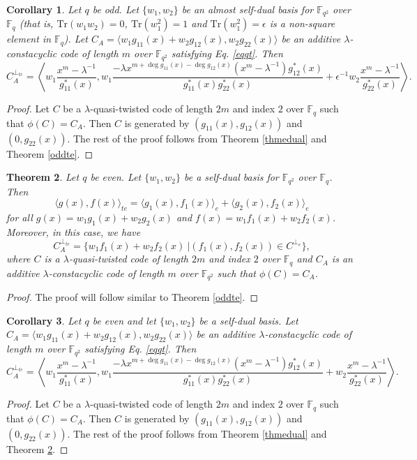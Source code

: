\documentclass[12 pt]{extarticle}
\numberwithin{equation}{section}
\newtheorem{theorem}{Theorem}[section]
\newtheorem{corollary}[theorem]{Corollary}
\theoremstyle{definition}
\begin{document}
\begin{corollary}\label{teodddual}
    Let  $q$ be odd. Let $\{w_1,w_2\}$ be an almost self-dual basis for $\mathbb{F}_{q^2}$ over $\mathbb{F}_q$ 
 (that is,  $\text{Tr}(w_1w_2)=0$, $\text{Tr}(w_1^2)=1$ and  $\text{Tr}(w_1^2)=\epsilon$ is a non-square element in $\mathbb{F}_q$). 
 Let $C_A=\langle w_1g_{11}(x)+w_2g_{12}(x),w_2g_{22}(x)\rangle$ be an additive $\lambda$-constacyclic code of length $m$ over $\mathbb{F}_{q^2}$  satisfying Eq. \ref{eqqt}. Then
    $$C_A^{\perp_{te}}=\left \langle w_1\frac{x^m-\lambda^{-1}}{g^*_{11}(x)}, w_1\frac{-\lambda x^{m+\deg g_{11}(x)-\deg g_{12}(x)}(x^m-\lambda^{-1})g^*_{12}(x)}{g^*_{11}(x)g^*_{22}(x)}+\epsilon^{-1}w_2\frac{x^m-\lambda^{-1}}{g^*_{22}(x)}\right \rangle.$$ 
\end{corollary}
\begin{proof}
    Let $C$ be a $\lambda$-quasi-twisted code of length $2m$ and index $2$ over $\mathbb{F}_q$ such that $\phi(C)=C_A$. Then $C$ is generated by $(g_{11}(x),g_{12}(x))$ and $(0,g_{22}(x))$. The rest of the proof follows from Theorem \ref{thmedual} and Theorem \ref{oddte}.
\end{proof}




\begin{theorem}\label{qevente}
Let $q$ be even. Let $\{w_1,w_2\}$ be a self-dual basis for $\mathbb{F}_{q^2}$ over $\mathbb{F}_q$. Then
 $$\langle g(x),f(x)\rangle_{te}=\langle g_1(x),f_1(x)\rangle_e+ \langle g_2(x),f_2(x)\rangle_e$$
  for all  $g(x)=w_1g_1(x)+w_2g_2(x)$ and $f(x)=w_1f_1(x)+w_2f_2(x)$.  Moreover, in this case, we have  $$C_A^{\perp_{te}}=\{w_1f_1(x)+w_2f_2(x)\ | (f_1(x),f_2(x))\in C^{\perp_e}\},$$
where $C$ is a $\lambda$-quasi-twisted code of length $2m$ and index $2$ over $\mathbb{F}_q$ and $C_A$ is an additive $\lambda$-constacyclic code of length $m$ over $\mathbb{F}_{q^2}$ such that  $\phi(C)=C_A$.
\end{theorem}
\begin{proof}
    The proof will follow similar to Theorem \ref{oddte}.
\end{proof}

\begin{corollary}\label{tedual}
    Let $q$ be even and let $\{w_1,w_2\} $ be a self-dual basis. Let $C_A=\langle w_1g_{11}(x)+w_2g_{12}(x),w_2g_{22}(x)\rangle$ be an additive $\lambda$-constacyclic code of length $m$ over $\mathbb{F}_{q^2}$ satisfying Eq. \ref{eqqt}. Then
    $$C_A^{\perp_{te}}=\left \langle w_1\frac{x^m-\lambda^{-1}}{g^*_{11}(x)},w_1\frac{-\lambda x^{m+\deg g_{11}(x)-\deg g_{12}(x)}(x^m-\lambda^{-1})g^*_{12}(x)}{g^*_{11}(x)g^*_{22}(x)}+w_2\frac{x^m-\lambda^{-1}}{g^*_{22}(x)}\right \rangle.$$
\end{corollary}
\begin{proof}
    Let $C$ be a $\lambda$-quasi-twisted code of length $2m$ and index $2$ over $\mathbb{F}_q$ such that $\phi(C)=C_A$. Then $C$ is generated by $(g_{11}(x),g_{12}(x))$ and $(0,g_{22}(x))$. The rest of the proof follows from Theorem \ref{thmedual} and Theorem \ref{qevente}.
\end{proof}
\end{document}

